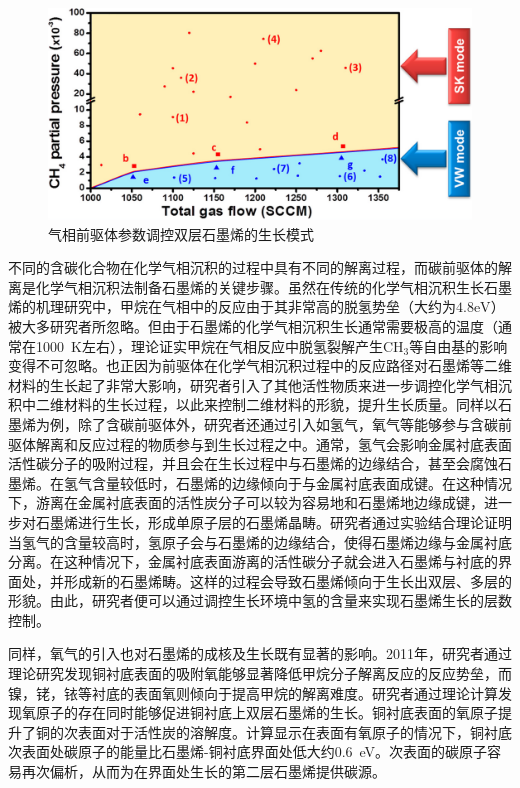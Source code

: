     \begin{figure}[htb]
        \includegraphics{pic/INTRO_growth_grapheneGasModeSwitchn.png}    
        \caption{气相前驱体参数调控双层石墨烯的生长模式}
        \label{fig:intro_growth_grapheneGasModeSwitch}
    \end{figure}

    不同的含碳化合物在化学气相沉积的过程中具有不同的解离过程，而碳前驱体的解离是化学气相沉积法制备石墨烯的关键步骤。虽然在传统的化学气相沉积生长石墨烯的机理研究中，甲烷在气相中的反应由于其非常高的脱氢势垒（大约为$4.8\si{\electronvolt}$）被大多研究者所忽略。但由于石墨烯的化学气相沉积生长通常需要极高的温度（通常在\SI{1000}{\kelvin}左右），理论证实甲烷在气相反应中脱氢裂解产生CH$_3$等自由基的影响变得不可忽略。也正因为前驱体在化学气相沉积过程中的反应路径对石墨烯等二维材料的生长起了非常大影响，研究者引入了其他活性物质来进一步调控化学气相沉积中二维材料的生长过程，以此来控制二维材料的形貌，提升生长质量。同样以石墨烯为例，除了含碳前驱体外，研究者还通过引入如氢气，氧气等能够参与含碳前驱体解离和反应过程的物质参与到生长过程之中。通常，氢气会影响金属衬底表面活性碳分子的吸附过程，并且会在生长过程中与石墨烯的边缘结合，甚至会腐蚀石墨烯。在氢气含量较低时，石墨烯的边缘倾向于与金属衬底表面成键。在这种情况下，游离在金属衬底表面的活性炭分子可以较为容易地和石墨烯地边缘成键，进一步对石墨烯进行生长，形成单原子层的石墨烯晶畴。研究者通过实验结合理论证明当氢气的含量较高时，氢原子会与石墨烯的边缘结合，使得石墨烯边缘与金属衬底分离。在这种情况下，金属衬底表面游离的活性碳分子就会进入石墨烯与衬底的界面处，并形成新的石墨烯畴。这样的过程会导致石墨烯倾向于生长出双层、多层的形貌。由此，研究者便可以通过调控生长环境中氢的含量来实现石墨烯生长的层数控制。

    同样，氧气的引入也对石墨烯的成核及生长既有显著的影响。2011年，研究者通过理论研究发现铜衬底表面的吸附氧能够显著降低甲烷分子解离反应的反应势垒，而镍，铑，铱等衬底的表面氧则倾向于提高甲烷的解离难度。研究者通过理论计算发现氧原子的存在同时能够促进铜衬底上双层石墨烯的生长。铜衬底表面的氧原子提升了铜的次表面对于活性炭的溶解度。计算显示在表面有氧原子的情况下，铜衬底次表面处碳原子的能量比石墨烯-铜衬底界面处低大约\SI{0.6}{\electronvolt}。次表面的碳原子容易再次偏析，从而为在界面处生长的第二层石墨烯提供碳源。

